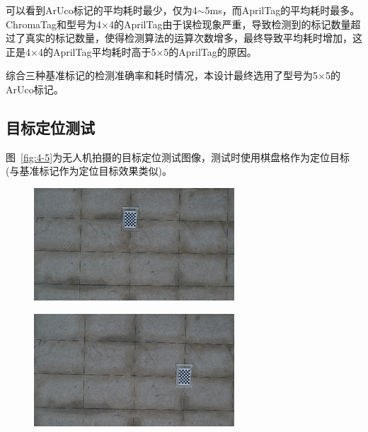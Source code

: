可以看到ArUco标记的平均耗时最少，仅为4$\sim$5ms，而AprilTag的平均耗时最多。ChromaTag和型号为4×4的AprilTag由于误检现象严重，导致检测到的标记数量超过了真实的标记数量，使得检测算法的运算次数增多，最终导致平均耗时增加，这正是4×4的AprilTag平均耗时高于5×5的AprilTag的原因。

综合三种基准标记的检测准确率和耗时情况，本设计最终选用了型号为5×5的ArUco标记。

\subsection{目标定位测试}
图~\ref{fig:4-5}为无人机拍摄的目标定位测试图像，测试时使用棋盘格作为定位目标(与基准标记作为定位目标效果类似)。

\begin{figure}[htb]
	\begin{minipage}[t]{0.5\linewidth}
		\centering
		\includegraphics[width=\columnwidth]{figures/4-5a.png} 
		\label{fig:4-5a} 
	\end{minipage}
	\begin{minipage}[t]{0.5\linewidth} 
		\centering
		\includegraphics[width=\columnwidth]{figures/4-5b.png} 

\end{minipage}
\end{figure}
